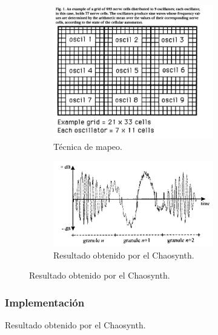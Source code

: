 \documentclass[16pt,spanish]{article}
\begin{document}
\begin{figure}[h!]
\begin{figure}[h!]
\begin{subfigure}[f]{0.5\linewidth}
\includegraphics[width=0.5\linewidth]{imagesCA/mapping_technique.jpg}
\caption{Técnica de mapeo.~\cite{miranda1995granular}}
\end{subfigure}
\begin{subfigure}[g]{0.5\linewidth}
\includegraphics[width=0.5\linewidth]{imagesCA/Granular_output.jpg}
\caption{Resultado obtenido por el Chaosynth.~\cite{miranda1995granular}}
\end{subfigure}
\end{figure}


\subsubsection{Implementación}


\end{figure}
\end{document}

